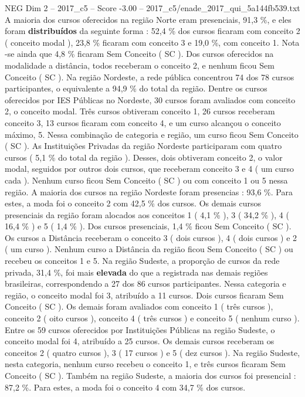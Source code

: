 \begin{textsample}{NEG Dim 2 – 2017\_c5 – Score -3.00 – 2017\_c5/enade\_2017\_qui\_5a144fb539.txt}
A maioria dos cursos oferecidos na região Norte eram presenciais, 91,3 \%, e eles foram \textbf{distribuídos} da seguinte forma : 52,4 \% dos cursos ficaram com conceito 2 ( conceito modal ), 23,8 \% ficaram com conceito 3 e 19,0 \%, com conceito 1.
Nota -se ainda que 4,8 \% ficaram Sem Conceito ( SC ).
Dos cursos oferecidos na modalidade a distância, todos receberam o conceito 2, e nenhum ficou Sem Conceito ( SC ).
Na região Nordeste, a rede pública concentrou 74 dos 78 cursos participantes, o equivalente a 94,9 \% do total da região.
Dentre os cursos oferecidos por IES Públicas no Nordeste, 30 cursos foram avaliados com conceito 2, o conceito modal.
Três cursos obtiveram conceito 1, 26 cursos receberam conceito 3, 13 cursos ficaram com conceito 4, e um curso alcançou o conceito máximo, 5.
Nessa combinação de categoria e região, um curso ficou Sem Conceito ( SC ).
As Instituições Privadas da região Nordeste participaram com quatro cursos ( 5,1 \% do total da região ).
Desses, dois obtiveram conceito 2, o valor modal, seguidos por outros dois cursos, que receberam conceito 3 e 4 ( um curso cada ).
Nenhum curso ficou Sem Conceito ( SC ) ou com conceito 1 ou 5 nessa região.
A maioria dos cursos na região Nordeste foram presencias : 93,6 \%.
Para estes, a moda foi o conceito 2 com 42,5 \% dos cursos.
Os demais cursos presenciais da região foram alocados aos conceitos 1 ( 4,1 \% ), 3 ( 34,2 \% ), 4 ( 16,4 \% ) e 5 ( 1,4 \% ).
Dos cursos presenciais, 1,4 \% ficou Sem Conceito ( SC ).
Os cursos a Distância receberam o conceito 3 ( dois cursos ), 4 ( dois cursos ) e 2 ( um curso ).
Nenhum curso a Distância da região ficou Sem Conceito ( SC ) ou recebeu os conceitos 1 e 5.
Na região Sudeste, a proporção de cursos da rede privada, 31,4 \%, foi mais \textbf{elevada} do que a registrada nas demais regiões brasileiras, correspondendo a 27 dos 86 cursos participantes.
Nessa categoria e região, o conceito modal foi 3, atribuído a 11 cursos.
Dois cursos ficaram Sem Conceito ( SC ).
Os demais foram avaliados com conceito 1 ( três cursos ), conceito 2 ( oito cursos ), conceito 4 ( três cursos ) e conceito 5 ( nenhum curso ).
Entre os 59 cursos oferecidos por Instituições Públicas na região Sudeste, o conceito modal foi 4, atribuído a 25 cursos.
Os demais cursos receberam os conceitos 2 ( quatro cursos ), 3 ( 17 cursos ) e 5 ( dez cursos ).
Na região Sudeste, nesta categoria, nenhum curso recebeu o conceito 1, e três cursos ficaram Sem Conceito ( SC ).
Também na região Sudeste, a maioria dos cursos foi presencial : 87,2 \%.
Para estes, a moda foi o conceito 4 com 34,7 \% dos cursos.

\end{textsample}
